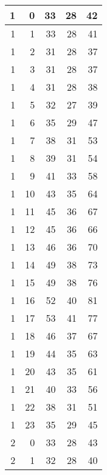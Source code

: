     \begin{longtable}{|r|r|r|r|r|}
		\hline
    1     & 0     & 33    & 28    & 42 \\
    \hline
    1     & 1     & 33    & 28    & 41 \\
    \hline
    1     & 2     & 31    & 28    & 37 \\
    \hline
    1     & 3     & 31    & 28    & 37 \\
    \hline
    1     & 4     & 31    & 28    & 38 \\
    \hline
    1     & 5     & 32    & 27    & 39 \\
    \hline
    1     & 6     & 35    & 29    & 47 \\
    \hline
    1     & 7     & 38    & 31    & 53 \\
    \hline
    1     & 8     & 39    & 31    & 54 \\
    \hline
    1     & 9     & 41    & 33    & 58 \\
    \hline
    1     & 10    & 43    & 35    & 64 \\
    \hline
    1     & 11    & 45    & 36    & 67 \\
    \hline
    1     & 12    & 45    & 36    & 66 \\
    \hline
    1     & 13    & 46    & 36    & 70 \\
    \hline
    1     & 14    & 49    & 38    & 73 \\
    \hline
    1     & 15    & 49    & 38    & 76 \\
    \hline
    1     & 16    & 52    & 40    & 81 \\
    \hline
    1     & 17    & 53    & 41    & 77 \\
    \hline
    1     & 18    & 46    & 37    & 67 \\
    \hline
    1     & 19    & 44    & 35    & 63 \\
    \hline
    1     & 20    & 43    & 35    & 61 \\
    \hline
    1     & 21    & 40    & 33    & 56 \\
    \hline
    1     & 22    & 38    & 31    & 51 \\
    \hline
    1     & 23    & 35    & 29    & 45 \\
    \hline
    2     & 0     & 33    & 28    & 43 \\
    \hline
    2     & 1     & 32    & 28    & 40 \\

\end{longtable}
